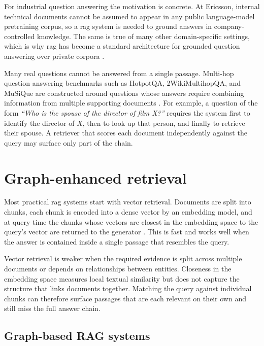 \documentclass[english, bibtex]{kththesis}               %
\numberwithin{listing}{chapter}
\begin{document}
For industrial question answering the motivation is concrete. At Ericsson, internal technical documents cannot be assumed to appear in any public language-model pretraining corpus, so a \gls{rag} system is needed to ground answers in company-controlled knowledge. The same is true of many other domain-specific settings, which is why \gls{rag} has become a standard architecture for grounded question answering over private corpora \cite{gao2023ragsurvey}.

Many real questions cannot be answered from a single passage. Multi-hop question answering benchmarks such as HotpotQA, 2WikiMultihopQA, and MuSiQue are constructed around questions whose answers require combining information from multiple supporting documents \cite{yang2018hotpotqa,ho2020twowiki,trivedi2022musique}. For example, a question of the form \emph{``Who is the spouse of the director of film X?''} requires the system first to identify the director of \(X\), then to look up that person, and finally to retrieve their spouse. A retriever that scores each document independently against the query may surface only part of the chain.

\section{Graph-enhanced retrieval}
\label{sec:backgroundHybridGraph}

Most practical \gls{rag} systems start with vector retrieval. Documents are split into chunks, each chunk is encoded into a dense vector by an embedding model, and at query time the chunks whose vectors are closest in the embedding space to the query's vector are returned to the generator \cite{lewis2020rag,karpukhin2020dpr}. This is fast and works well when the answer is contained inside a single passage that resembles the query.

Vector retrieval is weaker when the required evidence is split across multiple documents or depends on relationships between entities. Closeness in the embedding space measures local textual similarity but does not capture the structure that links documents together. Matching the query against individual chunks can therefore surface passages that are each relevant on their own and still miss the full answer chain.

\subsection{Graph-based RAG systems}
\label{sec:backgroundGraphSystems}
\end{document}
